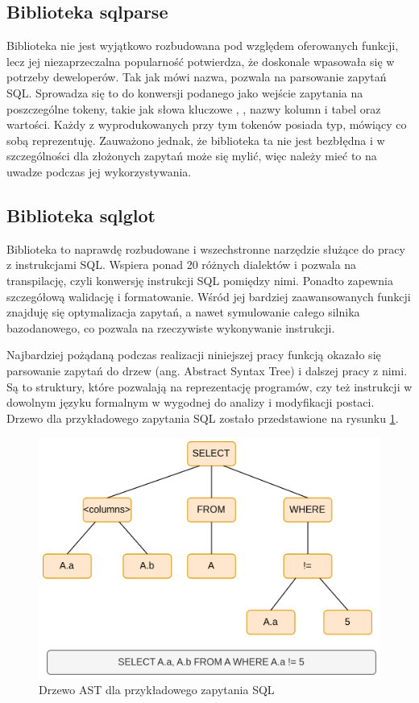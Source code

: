 \subsection{Biblioteka sqlparse}
Biblioteka  nie jest wyjątkowo rozbudowana pod względem oferowanych funkcji, lecz jej niezaprzeczalna popularność potwierdza, że doskonale wpasowała się w potrzeby deweloperów. Tak jak mówi nazwa,  pozwala na parsowanie zapytań SQL. Sprowadza się to do konwersji podanego jako wejście zapytania na poszczególne tokeny, takie jak słowa kluczowe , , nazwy kolumn i tabel oraz wartości. Każdy z wyprodukowanych przy tym tokenów posiada typ, mówiący co sobą reprezentuję. Zauważono jednak, że biblioteka ta nie jest bezbłędna i w szczególności dla złożonych zapytań może się mylić, więc należy mieć to na uwadze podczas jej wykorzystywania.

\subsection{Biblioteka sqlglot}
Biblioteka  to naprawdę rozbudowane i wszechstronne narzędzie służące do pracy z instrukcjami SQL. Wspiera ponad 20 różnych dialektów i pozwala na transpilację, czyli konwersję instrukcji SQL pomiędzy nimi. Ponadto zapewnia szczegółową walidację i formatowanie. Wśród jej bardziej zaawansowanych funkcji znajduję się optymalizacja zapytań, a nawet symulowanie całego silnika bazodanowego, co pozwala na rzeczywiste wykonywanie instrukcji.

Najbardziej pożądaną podczas realizacji niniejszej pracy funkcją okazało się parsowanie zapytań do drzew  (ang. Abstract Syntax Tree) i dalszej pracy z nimi. Są to struktury, które pozwalają na reprezentację programów, czy też instrukcji w dowolnym języku formalnym w wygodnej do analizy i modyfikacji postaci. Drzewo  dla przykładowego zapytania SQL zostało przedstawione na rysunku \ref{fig:sql-ast-example}.

\begin{figure}[ht!]
  \centering
  \includegraphics[width=0.6\linewidth]{images/ast_example.png}
  \caption{Drzewo AST dla przykładowego zapytania SQL}
  \label{fig:sql-ast-example}
\end{figure}



